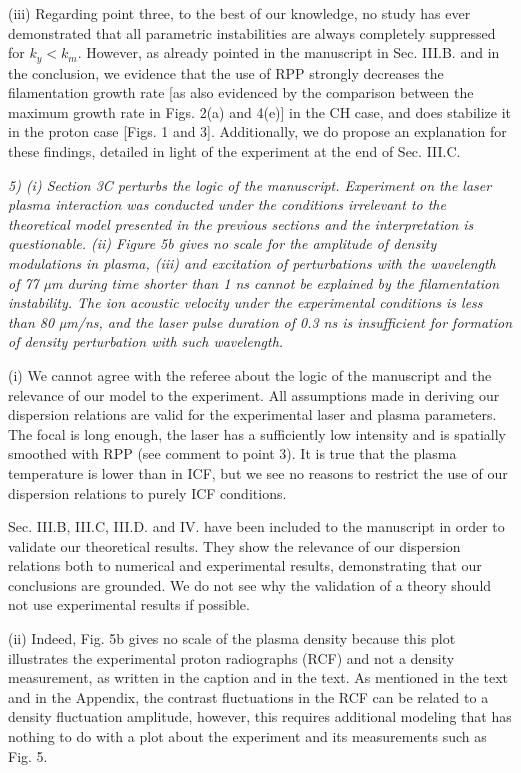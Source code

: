 \documentclass{article}
\begin{document}
(iii) Regarding point three, to the best of our knowledge, no study has ever demonstrated that all parametric instabilities are always completely suppressed  for $k_y < k_m$. 
However, as already  pointed in the manuscript in Sec. III.B. and in the conclusion, we evidence that the use of RPP strongly decreases the filamentation growth rate [as also evidenced by the comparison between the maximum growth rate in Figs.  2(a) and 4(e)] in the CH case, and does stabilize it in the proton case [Figs. 1 and 3]. 
Additionally, we do propose an explanation for these findings, detailed in light of the experiment  at the end of Sec. III.C.

\textit{
5) (i) Section 3C perturbs the logic of the manuscript. Experiment on the laser plasma interaction was conducted under the conditions irrelevant to the theoretical model presented in the previous sections and the interpretation is questionable. (ii) Figure 5b gives no scale for the amplitude of density modulations in plasma, (iii) and excitation of perturbations with the wavelength of 77 µm during time shorter than 1 ns cannot be explained by the filamentation instability. The ion acoustic velocity under the experimental conditions is less than 80 µm/ns, and the laser pulse duration of 0.3 ns is insufficient for formation of density perturbation with such wavelength. }

(i) We cannot agree with the referee about the logic of the manuscript and the relevance of our model to the experiment. 
All assumptions made in deriving our dispersion relations are valid for the experimental laser and plasma parameters. The focal is long enough, the laser has a sufficiently low intensity and is spatially smoothed with RPP (see comment to point 3). It is true that the  plasma temperature is lower than in  ICF, but we see no reasons to  restrict the use of our dispersion relations to purely ICF conditions.

Sec.  III.B, III.C, III.D. and IV. have been included to the manuscript in order to  validate our theoretical results. They show the relevance of our dispersion relations both to numerical and experimental results, demonstrating that our conclusions are grounded. We do not see why the validation of a theory should not use experimental results if possible.

(ii) Indeed, Fig. 5b gives no scale of the plasma density because this plot illustrates the experimental proton radiographs (RCF)  and not a density measurement, as written in the caption and in the text. As mentioned in the text and in the Appendix, the contrast fluctuations in the RCF can be related to a density fluctuation amplitude, however, this requires additional modeling that has nothing to do with a plot about the experiment and its measurements such as Fig. 5.
\end{document}
